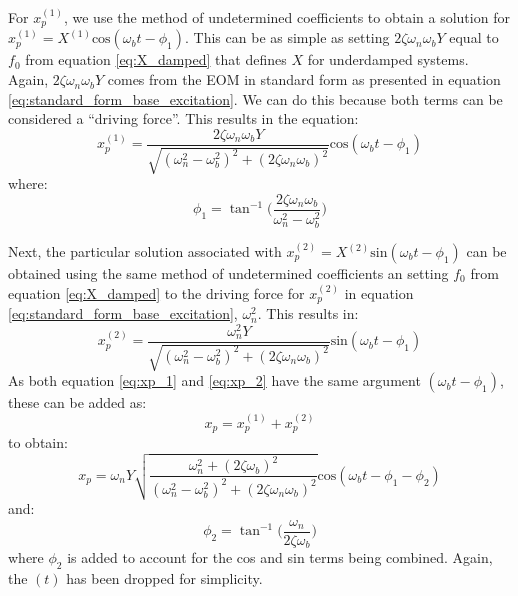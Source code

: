 \documentclass[12pt,letter]{article}
\numberwithin{ex}{section} %
\numberwithin{re}{section} %
\numberwithin{vcs}{section} %
\begin{document}
				For $x_p^{(1)}$, we use the method of undetermined coefficients to obtain a solution for $x_p^{(1)} = X^{(1)}\text{cos}(\omega_b t - \phi_1)$. This can be as simple as setting $2 \zeta \omega_n \omega_b Y$ equal to $f_0$ from equation \ref{eq:X_damped} that defines $X$ for underdamped systems. Again, $2 \zeta \omega_n \omega_b Y$  comes from the EOM in standard form as presented in equation 	
				\ref{eq:standard_form_base_excitation}. We can do this because both terms can be considered a ``driving force''. This results in the equation:
				\begin{equation}
					x_p^{(1)} = \frac{2 \zeta \omega_n \omega_b Y}{\sqrt{(\omega_n^2 - \omega_b^2)^2 +  (2\zeta \omega_n \omega_b)^2}}  \text{cos}(\omega_b t - \phi_1)
					\label{eq:xp_1}
				\end{equation}
				where:
				\begin{equation}
					\phi_1 = \tan^{-1} \bigg(\frac{2\zeta \omega_n \omega_b}{\omega_n^2 - \omega_b^2}\bigg)
				\end{equation}
				
				Next, the particular solution associated with $x_p^{(2)} = X^{(2)} \text{sin}(\omega_b t - \phi_1)$ can be obtained using the same method of undetermined coefficients an setting $f_0$ from equation \ref{eq:X_damped} to the driving force for $x_p^{(2)}$ in equation  \ref{eq:standard_form_base_excitation}, $\omega_n^2$. This results in:
				\begin{equation}
					x_p^{(2)} = \frac{\omega_n^2 Y}{\sqrt{(\omega_n^2 - \omega_b^2)^2 +  (2\zeta \omega_n \omega_b)^2}}  \text{sin}(\omega_b t - \phi_1)
					\label{eq:xp_2}
				\end{equation}
				As both equation \ref{eq:xp_1} and \ref{eq:xp_2}  have the same argument $(\omega_b t - \phi_1)$, these can be added as:
				\begin{equation}
					x_p = 	x_p^{(1)} + x_p^{(2)}
				\end{equation}
				to obtain:
				\begin{equation}
					x_p = 	\omega_n Y   \sqrt{\frac{\omega_n^2 + (2 \zeta \omega_b)^2 }{(\omega_n^2 - \omega_b^2)^2 +  (2\zeta \omega_n \omega_b)^2} }  \text{cos}(\omega_bt - \phi_1 - \phi_2)
				\end{equation}
				and:
				\begin{equation}
					\phi_2 = \tan^{-1} \bigg(\frac{\omega_n}{2\zeta \omega_b}\bigg)
				\end{equation}
				where $\phi_2$ is added to account for the cos and sin terms being combined. Again, the $(t)$ has been dropped for simplicity. 
				
\end{document}
